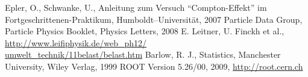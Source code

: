 \renewcommand{\refname}{Literatur und Programme}
\begin{thebibliography}{xxxxxx}
Epler, O., Schwanke, U., Anleitung zum Versuch ``Compton-Effekt'' im
Fortgeschrittenen-Praktikum, Humboldt–Universität, 2007
Particle Data Group, Particle Physics Booklet, Physics Letters, 2008
E. Leitner, U. Finckh et al.,\\
\href{http://www.leifiphysik.de/web_ph12/umwelt_technik/11belast/belast.htm}{
http://www.leifiphysik.de/web\_ph12/\\umwelt\_technik/11belast/belast.htm}
Barlow, R. J., Statistics, Manchester University, Wiley Verlag, 1999
ROOT Version 5.26/00, 2009, \href{http://root.cern.ch}{http://root.cern.ch}
\end{thebibliography}